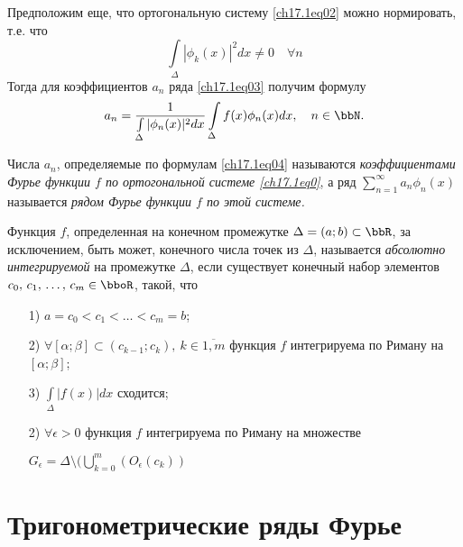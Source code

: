 Предположим еще, что ортогональную систему \eqref{ch17.1eq02} можно нормировать, т.е. что
$$
\int \limits_\Delta|\phi_k(x)|^2dx\ne 0 \quad \forall n
$$
Тогда для коэффициентов $a_n$ ряда \eqref{ch17.1eq03} получим формулу
\begin{equation} \label{ch17.1eq04}
a_n= \frac{1}{\int \limits_\Delta|\phi_n(x)|^2dx} \int \limits_\Delta f(x)\phi_n(x)dx, \quad n\in \bbN.
\end{equation}

\begin{defn}
Числа $a_n$, определяемые по формулам \eqref{ch17.1eq04} называются \textit{коэффициентами Фурье функции $f$ по ортогональной системе \eqref{ch17.1eq0}}, а ряд $\sum\limits_{n = 1}^{\infty} a_n \phi_n(x)$ называется \textit{рядом Фурье функции $f$ по этой системе.} 	
\end{defn}

\begin{defn} 
Функция $f$, определенная на конечном промежутке $\Delta=(a;b)\subset \bbR$, за исключением, быть может, конечного числа точек из $\Delta$, называется \textit{абсолютно интегрируемой} на промежутке $\Delta$, если существует конечный набор элементов $c_0, \,c_1,\,\ldots,\,c_m \in \bboR$, такой, что
\begin{enumerate}

\item[1)]	
$a=c_0<c_1<\ldots<c_m=b$;
\item[2)]
$\forall [\alpha;\beta]\subset(c_{k-1};c_k),\ k\in \overline{1,m}$ функция $f$ интегрируема по Риману на $[\alpha;\beta]$;	
\item[3)]
$\int \limits_\Delta |f(x)|dx$ сходится;
\item[2)]
$ \forall\epsilon>0$ функция $f$ интегрируема по Риману на множестве 

$G_{\epsilon}=\Delta \setminus (\bigcup \limits_{k=0}^{m}(O_{\epsilon}(c_k))$
\end{enumerate}	
\end{defn}
\section{Тригонометрические ряды Фурье}	
	
